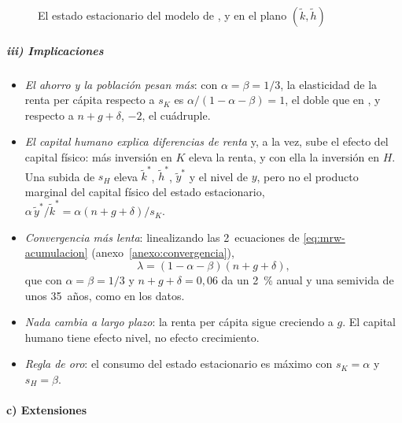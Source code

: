 \documentclass[11pt]{article}
\begin{document}
\begin{figure}[H]
\centering
\caption{El estado estacionario del modelo de ,  y  en el plano $(\tilde k,\tilde h)$}\label{fig:mrw-fases}
\end{figure}

\subparagraph{iii) Implicaciones}

\begin{itemize}
\item \emph{El ahorro y la población pesan más}: con $\alpha=\beta=1/3$, la elasticidad de la renta per cápita respecto a $s_K$ es $\alpha/(1-\alpha-\beta)=1$, el doble que en , y respecto a $n+g+\delta$, $-2$, el cuádruple.
\item \emph{El capital humano explica diferencias de renta} y, a la vez, sube el efecto del capital físico: más inversión en $K$ eleva la renta, y con ella la inversión en $H$. Una subida de $s_H$ eleva $\tilde k^*$, $\tilde h^*$, $\tilde y^*$ y el nivel de $y$, pero no el producto marginal del capital físico del estado estacionario, $\alpha\,\tilde y^*/\tilde k^*=\alpha(n+g+\delta)/s_K$.
\item \emph{Convergencia más lenta}: linealizando las 2~ecuaciones de \eqref{eq:mrw-acumulacion} (anexo~\ref{anexo:convergencia}),
  \[\lambda=(1-\alpha-\beta)(n+g+\delta),\]
  que con $\alpha=\beta=1/3$ y $n+g+\delta=0{,}06$ da un 2~\% anual y una semivida de unos 35~años, como en los datos.
\item \emph{Nada cambia a largo plazo}: la renta per cápita sigue creciendo a $g$. El capital humano tiene efecto nivel, no efecto crecimiento.
\item \emph{Regla de oro}: el consumo del estado estacionario es máximo con $s_K=\alpha$ y $s_H=\beta$.
\end{itemize}

\paragraph{c) Extensiones}
\end{document}
